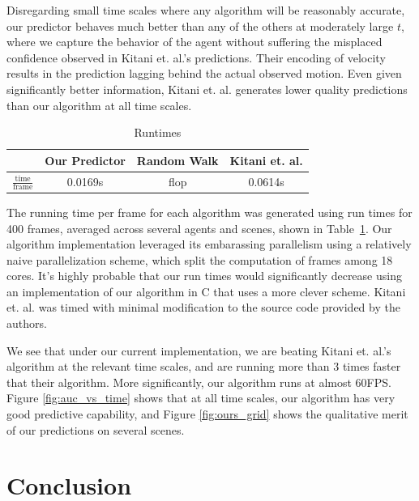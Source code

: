 \documentclass[letterpaper,10pt,conference]{ieeeconf}
\begin{document}
Disregarding small time scales where any algorithm will be reasonably accurate, our predictor behaves much better than any of the others at moderately large $t$, where we capture the  behavior of the agent without suffering the misplaced confidence observed in Kitani et. al.'s predictions. Their encoding of velocity results in the prediction lagging behind the actual observed motion. Even given significantly better information, Kitani et. al. generates lower quality predictions than our algorithm at all time scales. 
\begin{table}
\begin{center}
	\caption{Runtimes}
	\label{tab:time}
	\renewcommand{\arraystretch}{1.5}%
	\begin{tabular}{||c | c c  c ||} 
		\hline
		& Our Predictor & Random Walk & Kitani et. al. \\ [0.5ex] 
		\hline 
		$\frac{\mathrm{time}}{\mathrm{frame}}$ & 0.0169s & flop & 0.0614s \\
		\hline
		
	\end{tabular}
	

\end{center}
\end{table}

The running time per frame for each algorithm was generated using run times for 400 frames, averaged across several agents and scenes, shown in Table~\ref{tab:time}. Our algorithm implementation leveraged its embarassing parallelism using a relatively naive parallelization scheme, which split the computation of frames among 18 cores. It's highly probable that our run times would significantly decrease using an implementation of our algorithm in C that uses a more clever scheme. Kitani et. al. was timed with minimal modification to the source code provided by the authors. 

We see that under our current implementation, we are beating Kitani et. al.'s algorithm at the relevant time scales, and are running more than 3 times faster that their algorithm. More significantly, our algorithm runs at almost 60FPS. Figure \ref{fig:auc_vs_time} shows that at all time scales, our algorithm has very good predictive capability, and Figure \ref{fig:ours_grid} shows the qualitative merit of our predictions on several scenes.



\section{Conclusion} 
\label{sec:conclusion}
\end{document}
